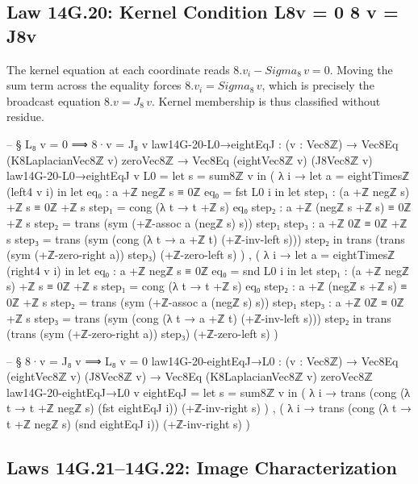 \documentclass[11pt,a4paper]{book}
\def\Sigma{Sigma}%
\def\Leftrightarrow{<=>}%
\def\cdot{.}%
\def\texorpdfstring#1#2{#2}%
\begin{document}
\subsection{Law 14G.20: Kernel Condition \texorpdfstring{$L_8\,v = 0 \Leftrightarrow 8 \cdot v = J_8\,v$}{L8v = 0 8 v = J8v}}

The kernel equation at each coordinate reads $8 \cdot v_i - \Sigma_8\,v = 0$. Moving the sum term across the equality forces $8 \cdot v_i = \Sigma_8\,v$, which is precisely the broadcast equation $8 \cdot v = J_8\,v$. Kernel membership is thus classified without residue.

\begin{code}
-- § L₈ v = 0 ⟹ 8·v = J₈ v
law14G-20-L0→eightEqJ : (v : Vec8ℤ) → Vec8Eq (K8LaplacianVec8ℤ v) zeroVec8ℤ → Vec8Eq (eightVec8ℤ v) (J8Vec8ℤ v)
law14G-20-L0→eightEqJ v L0 =
  let s = sum8ℤ v in
  ( λ i →
      let a = eightTimesℤ (left4 v i) in
      let eq₀ : a +ℤ negℤ s ≡ 0ℤ
          eq₀ = fst L0 i
      in
      let step₁ : (a +ℤ negℤ s) +ℤ s ≡ 0ℤ +ℤ s
          step₁ = cong (λ t → t +ℤ s) eq₀
          step₂ : a +ℤ (negℤ s +ℤ s) ≡ 0ℤ +ℤ s
          step₂ = trans (sym (+ℤ-assoc a (negℤ s) s)) step₁
          step₃ : a +ℤ 0ℤ ≡ 0ℤ +ℤ s
          step₃ = trans (sym (cong (λ t → a +ℤ t) (+ℤ-inv-left s))) step₂
      in
      trans
        (trans (sym (+ℤ-zero-right a)) step₃)
        (+ℤ-zero-left s)
  ) ,
  ( λ i →
      let a = eightTimesℤ (right4 v i) in
      let eq₀ : a +ℤ negℤ s ≡ 0ℤ
          eq₀ = snd L0 i
      in
      let step₁ : (a +ℤ negℤ s) +ℤ s ≡ 0ℤ +ℤ s
          step₁ = cong (λ t → t +ℤ s) eq₀
          step₂ : a +ℤ (negℤ s +ℤ s) ≡ 0ℤ +ℤ s
          step₂ = trans (sym (+ℤ-assoc a (negℤ s) s)) step₁
          step₃ : a +ℤ 0ℤ ≡ 0ℤ +ℤ s
          step₃ = trans (sym (cong (λ t → a +ℤ t) (+ℤ-inv-left s))) step₂
      in
      trans
        (trans (sym (+ℤ-zero-right a)) step₃)
        (+ℤ-zero-left s)
  )

-- § 8·v = J₈ v ⟹ L₈ v = 0
law14G-20-eightEqJ→L0 : (v : Vec8ℤ) → Vec8Eq (eightVec8ℤ v) (J8Vec8ℤ v) → Vec8Eq (K8LaplacianVec8ℤ v) zeroVec8ℤ
law14G-20-eightEqJ→L0 v eightEqJ =
  let s = sum8ℤ v in
  ( λ i →
      trans
        (cong (λ t → t +ℤ negℤ s) (fst eightEqJ i))
        (+ℤ-inv-right s)
  ) ,
  ( λ i →
      trans
        (cong (λ t → t +ℤ negℤ s) (snd eightEqJ i))
        (+ℤ-inv-right s)
  )
\end{code}

\subsection{Laws 14G.21--14G.22: Image Characterization}
\end{document}
